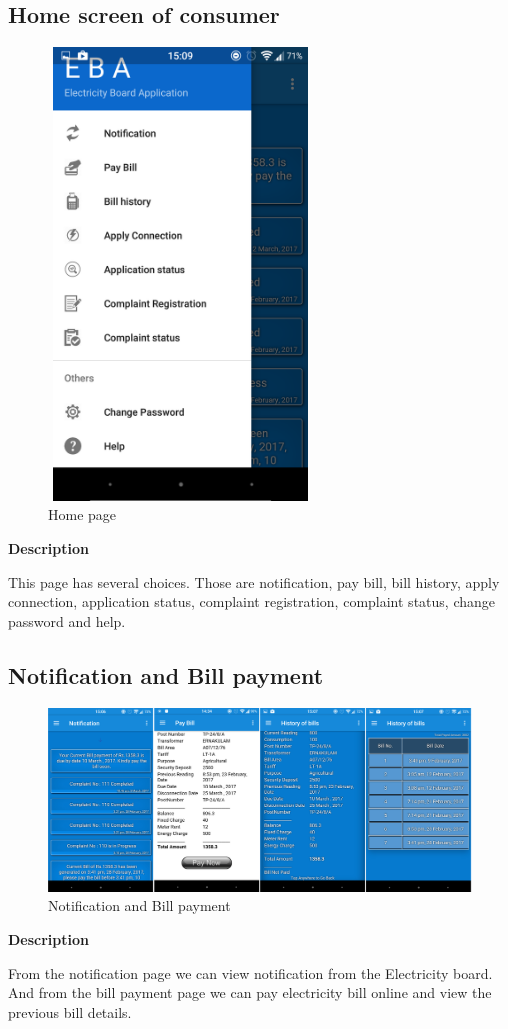 \documentclass[12pt,a4paper,oneside]{report}
\begin{document}
\subsection{Home screen of consumer}
\begin{figure}[h]
	\begin{center}
		\includegraphics[width=7cm,height=12cm]{homepage.png}
			\caption{Home page}
			\label{Home page}
	\end{center}
\end{figure}
\textbf{Description}
\par This page has several choices. Those are notification, pay bill, bill history, apply connection, application status, complaint registration, complaint status, change password and help.


\newpage
\subsection{Notification and Bill payment}
\begin{figure}[h]
	\begin{center}
		\includegraphics[scale=0.07]{billhis.jpg}
			\caption{Notification and Bill payment}
			\label{Notification and Bill payment}
	\end{center}
\end{figure}
\textbf{Description}
\par From the notification page we can view notification from the Electricity board. And from the bill payment page we can pay electricity bill online and view the previous bill details.
\end{document}
